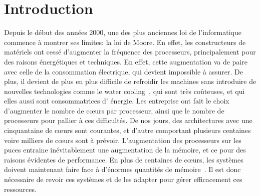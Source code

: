 \chapter{Introduction}

  \hspace{1cm}Depuis le début des années 2000, une des plus anciennes loi de
  l'informatique commence à montrer ses limites: la loi de Moore. En effet, les
  constructeurs de matériels ont cessé d'augmenter la fréquence des processeurs,
  principalement pour des raisons énergétiques et
  techniques. En effet, cette augmentation va de paire
  avec celle de la consommation électrique, qui devient impossible à assurer. De
  plus, il devient de plus en plus difficile de refroidir les machines sans
  introduire de nouvelles technologies comme le water
  cooling~\citep{googleXXXXdatacenters}, qui sont très coûteuses, et qui elles
  aussi sont consommatrices d' énergie. Les entreprise ont fait le choix
  d'augmenter le nombre de c\oe urs par processeur, ainsi que le nombre de
  processeurs pour pallier à ces difficultés. De nos jours, des architectures
  avec une cinquantaine de c\oe urs sont courantes, et d'autre comportant
  plusieurs centaines voire milliers de c\oe urs sont à prévoir. L'augmentation
  des processeurs sur les puces entraine inévitablement une augmentation de la
  mémoire, et ce pour des raisons évidentes de performance. En plus de centaines
  de c\oe urs, les systèmes doivent maintenant faire face à d'énormes quantités
  de mémoire~\citep{hp2012z820, puget2013z9pe}. Il est donc nécessaire de revoir
  ces systèmes et de les adapter pour gérer efficacement ces ressources.\newline
  

